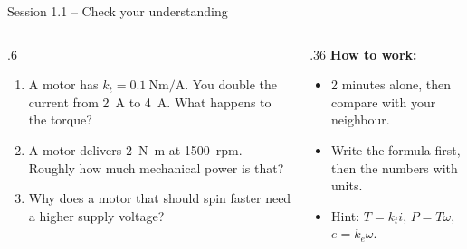 \documentclass[aspectratio=169,10pt]{beamer}
\begin{document}
\begin{frame}{Session 1.1 -- Check your understanding}
\begin{columns}[T]
\begin{column}{.6\textwidth}
\begin{keybox}
\begin{enumerate}\setlength\itemsep{6pt}
\item A motor has $k_t=\SI{0.1}{\newton\metre\per\ampere}$. You double the current from \SI{2}{\ampere} to \SI{4}{\ampere}. What happens to the torque?
\item A motor delivers \SI{2}{\newton\metre} at \SI{1500}{rpm}. Roughly how much mechanical power is that?
\item Why does a motor that should spin faster need a higher supply voltage?
\end{enumerate}
\end{keybox}
\end{column}
\begin{column}{.36\textwidth}
\small
\textbf{How to work:}
\begin{itemize}
\item 2 minutes alone, then compare with your neighbour.
\item Write the formula first, then the numbers with units.
\item Hint: $T=k_t i$, $P=T\omega$, $e=k_e\omega$.
\end{itemize}
\end{column}
\end{columns}
\end{frame}
\end{document}
